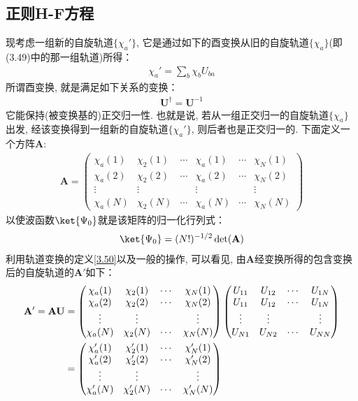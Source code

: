 \subsection{正则H-F方程}
现考虑一组新的自旋轨道$\{\chi_a'\}$, 
它是通过如下的酉变换从旧的自旋轨道$\{\chi_a\}$(即(3.49)中的那一组轨道)所得：
\begin{align}
	\label{3.50}
	\chi_a' = \sum_b\chi_bU_{ba}
\end{align}
所谓酉变换, 
就是满足如下关系的变换：
\begin{align}
	\mathbf{U}^\dagger = \mathbf{U}^{-1}
\end{align}
它能保持(被变换基的)正交归一性. 
也就是说, 
若从一组正交归一的自旋轨道$\{\chi_a\}$出发, 
经该变换得到一组新的自旋轨道$\{\chi_a'\}$, 
则后者也是正交归一的. 
下面定义一个方阵$\mathbf{A}$:
\begin{align}
	\mathbf{A} = 
	\begin{pmatrix}
		\chi_a(1) & \chi_2(1) & \cdots & \chi_a(1) & \cdots & \chi_N(1) \\
		\chi_a(2) & \chi_2(2) & \cdots & \chi_a(2) & \cdots & \chi_N(2) \\
		\vdots    & \vdots    &        & \vdots    &        & \vdots    \\
		\chi_a(N) & \chi_2(N) & \cdots & \chi_a(N) & \cdots & \chi_N(N)
	\end{pmatrix}
\end{align}
以使波函数$\ket{\Psi_0}$就是该矩阵的归一化行列式：
\begin{align}
	\ket{\Psi_0} = (N!)^{-1/2}\det(\mathbf{A})
\end{align}
利用轨道变换的定义\autoref{3.50}以及一般的操作, 
可以看见, 
由$\mathbf{A}$经变换所得的包含变换后的自旋轨道的$\mathbf{A}'$如下：
\begin{align}
	\mathbf{A}'  = \mathbf{AU} & = 
	\begin{pmatrix}
		\chi_a(1) & \chi_2(1) & \cdots & \chi_N(1) \\
		\chi_a(2) & \chi_2(2) & \cdots & \chi_N(2) \\
		\vdots    & \vdots    &        & \vdots    \\
		\chi_a(N) & \chi_2(N) & \cdots & \chi_N(N)
	\end{pmatrix}
	\begin{pmatrix}
		U_{11} & U_{12} & \cdots & U_{1N} \\
		U_{11} & U_{12} & \cdots & U_{1N} \\
		\vdots & \vdots &        & \vdots \\
		U_{N1} & U_{N2} & \cdots & U_{NN}
	\end{pmatrix} \notag\\
	& = \begin{pmatrix}
		\chi_a'(1) & \chi_2'(1) & \cdots & \chi_N'(1) \\
		\chi_a'(2) & \chi_2'(2) & \cdots & \chi_N'(2) \\
		\vdots     & \vdots     &        & \vdots     \\
		\chi_a'(N) & \chi_2'(N) & \cdots & \chi_N'(N)
	\end{pmatrix}
\end{align}
